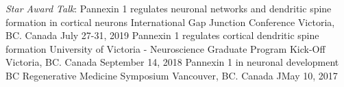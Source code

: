 


\begin{cventries}

    \cventry
      {\textit{Star Award Talk}: Pannexin 1 regulates neuronal networks and dendritic spine formation in cortical neurons} %
      {International Gap Junction Conference} %
      {Victoria, BC. Canada} %
      {July 27-31, 2019} %
      {
      }
    \cventry
    {Pannexin 1 regulates cortical dendritic spine formation} %
    {University of Victoria - Neuroscience Graduate Program Kick-Off} %
    {Victoria, BC. Canada} %
    {September 14, 2018} %
   {
   }
   \cventry
   {Pannexin 1 in neuronal development} %
   {BC Regenerative Medicine Symposium} %
   {Vancouver, BC. Canada} %
   {JMay 10, 2017} %
   {
   }
\end{cventries}

